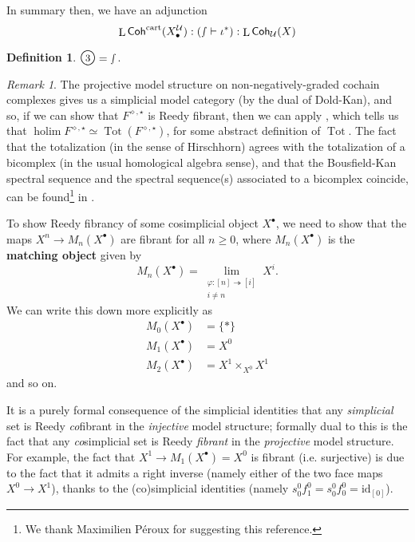 \documentclass[11pt,fleqn]{article}
\theoremstyle{plain}
\theoremstyle{definition}
\newtheorem{definition}[theorem]{Definition}
\theoremstyle{remark}
\newtheorem{remark}[theorem]{Remark}
\numberwithin{equation}{theorem}
\newcommand{\cover}{\mathcal{U}}
\newcommand{\anotherbullet}{\star}
\newcommand{\yetanotherbullet}{\diamond}
\newcommand{\id}{\mathrm{id}}
\newcommand{\gcohUX}{\mathsf{Coh}_{\cover}(X)}
\newcommand{\cartcohX}{\mathsf{Coh}^\mathrm{cart}(X_\bullet^\cover)}
\newcommand{\define}[1]{\textbf{#1}}
\newcommand{\numberincircle}[1]{\text{\Large\textcircled{\small #1}}}
\DeclareMathOperator{\Tot}{Tot}
\DeclareMathOperator{\LL}{L}
\DeclareMathOperator{\holim}{holim}
\begin{document}
        \medskip

        In summary then, we have an adjunction
        \begin{equation}
        \label{equation:adjunction-of-localisations}
            \LL{\cartcohX}:(\smallint\vdash\iota^*):\LL{\gcohUX}
        \end{equation}

        \begin{definition}\label{definition:defining-numberincircle3}
            $\numberincircle{3}=\smallint$.
        \end{definition}

        \begin{remark}\label{remark:reedy-totalisation-etc}
            The projective model structure on non-negatively-graded cochain complexes gives us a simplicial model category (by the dual of Dold-Kan), and so, if we can show that $F^{\yetanotherbullet,\anotherbullet}$ is Reedy fibrant, then we can apply \cite[Theorem~19.8.7]{Hirschhorn2003}, which tells us that $\holim F^{\yetanotherbullet,\anotherbullet}\simeq\Tot(F^{\yetanotherbullet,\anotherbullet})$, for some abstract definition of $\Tot$.
            The fact that the totalization (in the sense of Hirschhorn) agrees with the totalization of a bicomplex (in the usual homological algebra sense), and that the Bousfield-Kan spectral sequence and the spectral sequence(s) associated to a bicomplex coincide, can be found\footnote{We thank Maximilien Péroux for suggesting this reference.} in \cite[{}III.1.1.13]{Fresse2017}.

            To show Reedy fibrancy of some cosimplicial object $X^\bullet$, we need to show that the maps $X^n\to M_n(X^\bullet)$ are fibrant for all $n\geqslant0$, where $M_n(X^\bullet)$ is the \define{matching object} given by
            \[
                M_n(X^\bullet)
                =
                \lim_{\substack{\varphi\colon[n]\twoheadrightarrow[i] \\ i\neq n}} X^i.
            \]
            We can write this down more explicitly as
            \begin{align*}
                M_0(X^\bullet)
                &=
                \{*\}
            \\  M_1(X^\bullet)
                &=
                X^0
            \\  M_2(X^\bullet)
                &=
                X^1 \times_{X^0} X^1
            \end{align*}
            and so on.

            It is a purely formal consequence of the simplicial identities that any \emph{simplicial} set is Reedy \emph{co}fibrant in the \emph{injective} model structure; formally dual to this is the fact that any \emph{co}simplicial set is Reedy \emph{fibrant} in the \emph{projective} model structure.
            For example, the fact that $X^1\to M_1(X^\bullet)=X^0$ is fibrant (i.e. surjective) is due to the fact that it admits a right inverse (namely either of the two face maps $X^0\to X^1$), thanks to the (co)simplicial identities (namely $s_0^0 f_1^0 = s_0^0 f_0^0 = \id_{[0]}$).
        \end{remark}
\end{document}
